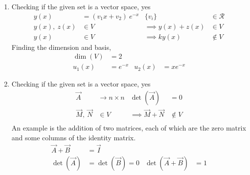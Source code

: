 \begin{enumerate}
    \item Checking if the given set is a vector space, \textcolor{y_h}{yes}
          \begin{align}
              y(x)                 & = (v_1 x + v_2)\ e^{-x} &
              \{v_i\}              & \in \mathcal{R}           \\
              y(x),\ z(x)          & \in V                   &
              \implies y(x) + z(x) & \in V                     \\
              y(x)                 & \in V                   &
              \implies ky(x)       & \not\in V
          \end{align}
          Finding the dimension and basis,
          \begin{align}
              \dim(V) & = 2         \\
              u_1(x)  & = e^{-x}  &
              u_2(x)  & = xe^{-x}
          \end{align}

    \item Checking if the given set is a vector space, \textcolor{y_h}{yes}
          \begin{align}
              \vec{A}                    & \rightarrow n \times n &
              \det(\vec{A})              & = 0                      \\
              \vec{M},\ \vec{N}          & \in V                  &
              \implies \vec{M} + \vec{N} & \not\in V                \\
          \end{align}
          An example is the addition of two matrices, each of which are the zero matrix
          and some columns of the identity matrix.
          \begin{align}
              \vec{A} + \vec{B}       & = \vec{I}             \\
              \det(\vec{A})           & = \det(\vec{B}) = 0 &
              \det(\vec{A} + \vec{B}) & = 1
          \end{align}


\end{enumerate}
